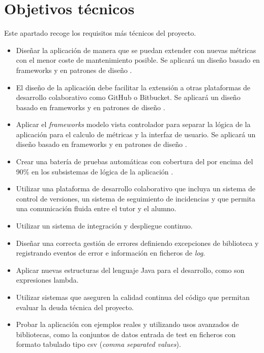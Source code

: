 \section{Objetivos técnicos}
Este apartado recoge los requisitos más técnicos del proyecto.
\begin{itemize}
	\tightlist
	\item Diseñar la aplicación de manera que se puedan extender con nuevas métricas con el menor coste de mantenimiento posible. Se aplicará un diseño basado en frameworks y en patrones de diseño \citep{gamma_patrones_2002}.
	\item El diseño de la aplicación debe facilitar la extensión a otras plataformas de desarrollo colaborativo como GitHub o Bitbucket. Se aplicará un diseño basado en frameworks y en patrones de diseño \citep{gamma_patrones_2002}.
	\item Aplicar el \textit{frameworks} modelo vista controlador para separar la lógica de la aplicación para el calculo de métricas y la interfaz de usuario.
	Se aplicará un diseño basado en frameworks y en patrones de diseño \citep{gamma_patrones_2002}.
	\item Crear una batería de pruebas automáticas con cobertura del por encima del 90\% en los subsistemas de lógica de la aplicación .
	\item Utilizar una plataforma de desarrollo colaborativo que incluya un sistema de control de versiones, un sistema de seguimiento de incidencias y que permita una comunicación fluida entre el tutor y el alumno.
	\item Utilizar un sistema de integración y despliegue continuo.
	\item Diseñar una correcta gestión de errores definiendo excepciones de biblioteca y registrando eventos de error e información en ficheros de \textit{log}. 
	\item Aplicar nuevas estructuras  del lenguaje Java para el desarrollo, como son expresiones lambda. 
	\item Utilizar sistemas que aseguren la calidad continua del código que permitan evaluar la deuda técnica del proyecto.
	\item Probar la aplicación con ejemplos reales y utilizando usos avanzados de bibliotecas, como la conjuntos de datos entrada de test en ficheros con formato tabulado tipo csv (\textit{comma separated values}). 	
\end{itemize}
